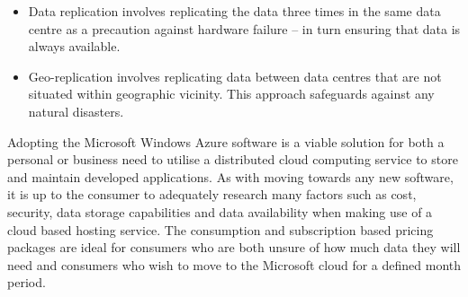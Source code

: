 \begin{itemize}


\ftAfourText

\clearpage %
\begin{itemize}
\item Data replication involves replicating the data three times in the same data centre as a precaution against hardware failure – in turn ensuring that data is always available. 

\item Geo-replication involves replicating data between data centres that are not situated within geographic vicinity. This approach safeguards against any natural disasters.
\end{itemize}
\end{itemize}


Adopting the Microsoft Windows Azure software is a viable solution for both a personal or business need to utilise a distributed cloud computing service to store and maintain developed applications. As with moving towards any new software, it is up to the consumer to adequately research many factors such as cost, security, data storage capabilities and data availability when making use of a cloud based hosting service. The consumption and subscription based pricing packages are ideal for consumers who are both unsure of how much data they will need and consumers who wish to move to the Microsoft cloud for a defined month period.
